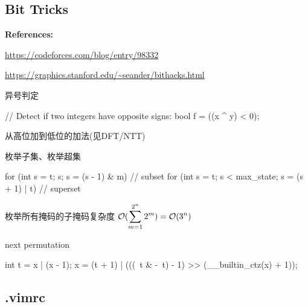 \subsection{Bit Tricks}

\noindent \textbf{\textbf{References:}}
\begin{compactenum}[(i)]
\item \url{https://codeforces.com/blog/entry/98332}
\item \url{https://graphics.stanford.edu/~seander/bithacks.html}
\end{compactenum}

\begin{compactenum}[1.]

\item 异号判定

\begin{cpplist}
// Detect if two integers have opposite signs:
bool f = ((x ^ y) < 0); 
\end{cpplist}

\item 从高位加到低位的加法(见DFT/NTT)

\item 枚举子集、枚举超集

\begin{cpplist}
for (int s = t; s; s = (s - 1) & m) {} // subset
for (int s = t; s < max_state; s = (s + 1) | t) {} // superset
\end{cpplist}

\item 枚举所有掩码的子掩码复杂度 $\mathcal{O}(\displaystyle\sum_{m=1}^{2^n}2^m)=\mathcal{O}(3^n)$

\item 
next permutation

\begin{cpplist}
int t = x | (x - 1);
x = (t + 1) | (((~t & -~t) - 1) >> (__builtin_ctz(x) + 1));
\end{cpplist}

\end{compactenum}

\subsection{.vimrc}

